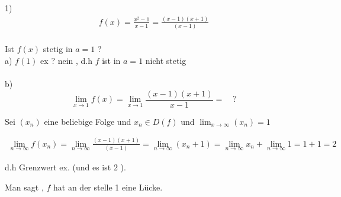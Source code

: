 \begin{example}
\begin{itemize}
1)
\begin{align*}
f(x) = \frac{x^2 - 1}{x - 1} =   
\frac{(x-1)(x+1)}{(x-1)}\\ 
\end{align*}

Ist $f(x)$ stetig in $a = 1$ ?\\

a) \quad $f(1)$ ex ? nein , d.h $f$ ist in $a = 1$ nicht stetig\\ 
\\
b) $$ \lim_{x \to 1}f(x) = \lim_{x \to 1}{\frac{(x-1)(x+1)}{x-1}} = \quad ? $$

Sei $(x_n)$ eine beliebige Folge und $x_n \in D(f)$ und $\lim_{x\to \infty}(x_n)=1$
\end{itemize}
\begin{gather*}
\lim_{n \to \infty }{f(x_n)} = \lim_{n \to \infty }
{\frac{(x-1)(x+1)}{(x-1)}} = \lim_{n \to \infty }{(x_n + 1) } = \lim_{n \to \infty }{x_n} + \lim_{n \to \infty }{1} = 1 + 1 = 2 
\end{gather*}

d.h Grenzwert ex. (und es ist 2 ).


Man sagt , $f$ hat an der stelle 1 eine Lücke.
\end{example}


